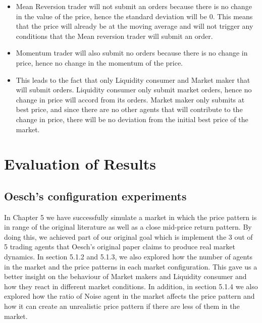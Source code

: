 \begin{itemize}
  \item Mean Reversion trader will not submit an orders because there is no change in the value of the price, hence the standard deviation will be 0. This means that the price will already be at the moving average and will not trigger any conditions that the Mean reversion trader will submit an order.
  \item Momentum trader will also submit no orders because there is no change in price, hence no change in the momentum of the price. 
  \item This leads to the fact that only Liquidity consumer and Market maker that will submit orders. Liquidity consumer only submit market orders, hence no change in price will accord from its orders. Market maker only submits at best price, and since there are no other agents that will contribute to the change in price, there will be no deviation from the initial best price of the market. 
\end{itemize}

\section{Evaluation of Results}

\subsection{Oesch's configuration experiments}
In Chapter 5 we have successfully simulate a market in which the price pattern is in range of the original literature as well as a close mid-price return pattern. By doing this, we achieved part of our original goal which is implement the 3 out of 5 trading agents that Oesch's original paper claims to produce real market dynamics. In section 5.1.2 and 5.1.3, we also explored how the number of agents in the market and the price patterns in each market configuration. This gave us a better insight on the behaviour of Market makers and Liquidity consumer and how they react in different market conditions. In addition, in section 5.1.4 we also explored how the ratio of Noise agent in the market affects the price pattern and how it can create an unrealistic price pattern if there are less of them in the market. 

